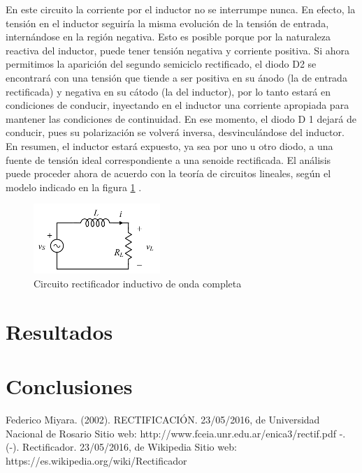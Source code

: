 \documentclass[a4paper,12pt]{article}
\begin{document}
\indent En este circuito la corriente por el inductor no se interrumpe nunca. En efecto, la tensión en el inductor seguiría la misma evolución de la tensión de entrada, internándose en la región negativa. Esto es posible porque por la naturaleza reactiva del inductor, puede tener tensión negativa y corriente positiva. Si ahora permitimos la aparición del segundo semiciclo rectificado, el diodo D2 se encontrará con una tensión que tiende a ser positiva en su ánodo (la de entrada rectificada) y negativa en su cátodo (la del inductor), por lo tanto estará en condiciones de conducir, inyectando en el inductor una corriente apropiada para mantener las condiciones de continuidad. En ese
momento, el diodo D 1 dejará de conducir, pues su polarización se volverá inversa, desvinculándose del inductor.\\

\indent En resumen, el inductor estará expuesto, ya sea por uno u otro diodo, a una fuente de tensión ideal correspondiente a una senoide rectificada. El análisis puede proceder ahora de acuerdo con la teoría de circuitos lineales, según el modelo indicado en la figura \ref{Figura6} .

\begin{figure}
  \begin{center}
    \includegraphics{images/Circuito_Inductivo_Lineal_Onda_Completa.png}
    \caption{Circuito rectificador inductivo de onda completa}
    \label{Figura6}
  \end{center}
\end{figure}

\section{Resultados}

\section{Conclusiones}

\begin{thebibliography}{9}
Federico Miyara. (2002). RECTIFICACIÓN. 23/05/2016, de Universidad Nacional de Rosario Sitio web: http://www.fceia.unr.edu.ar/enica3/rectif.pdf
-. (-). Rectificador. 23/05/2016, de Wikipedia Sitio web: https://es.wikipedia.org/wiki/Rectificador
\end{thebibliography}
\end{document}
